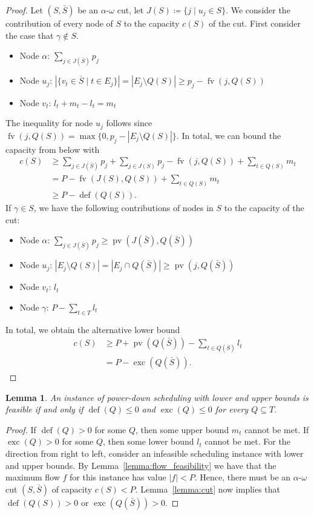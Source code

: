 \documentclass[a4paper]{article}
\DeclareMathOperator{\fv}{fv}
\DeclareMathOperator{\pv}{pv}
\DeclareMathOperator{\opdef}{def}
\DeclareMathOperator{\exc}{exc}
\newtheorem{lemma}[theorem]{Lemma}
\begin{document}
\begin{proof}
  Let $(S, \bar S)$ be an $\alpha$-$\omega$ cut, let $J(S) \coloneqq \{j \mid u_j \in S\}$.
  We consider the contribution of every node of $S$ to the capacity $c(S)$ of the cut.
  First consider the case that $\gamma \notin S$.
  \begin{itemize}
    \item Node $\alpha$: $\sum_{j \in J(\bar S)} p_j$
    \item Node $u_j$: $|\{v_t \in \bar S \mid t \in E_j\}| = | E_j \setminus Q(S) | \geq p_j - \fv(j, Q(S))$
    \item Node $v_t$: $l_t + m_t - l_t = m_t$
  \end{itemize}
  The inequality for node $u_j$ follows since $\fv(j, Q(S)) = \max \{0, p_j - |E_j \setminus Q(S)| \}$.
  In total, we can bound the capacity from below with
  \begin{align}
    c(S) &\geq \sum_{j \in J(\bar S)} p_j + \sum_{j \in J(S)} p_j - \fv(j, Q(S)) + \sum_{t \in Q(S)} m_t
    \\ &= P - \fv(J(S), Q(S)) + \sum_{t \in Q(S)} m_t
    \\ &\geq P - \opdef(Q(S))\text{.}
  \end{align}
  If $\gamma \in S$, we have the following contributions of nodes in $S$ to the capacity of the cut:
  \begin{itemize}
    \item Node $\alpha$: $\sum_{j \in J(\bar S)} p_j \geq \pv(J(\bar S), Q(\bar S))$
    \item Node $u_j$: $| E_j \setminus Q(S) |
      = | E_j \cap Q(\bar S)| \geq \pv(j, Q(\bar S))$
    \item Node $v_t$: $l_t$
    \item Node $\gamma$: $P - \sum_{t \in T} l_t$
  \end{itemize}
  In total, we obtain the alternative lower bound
  \begin{align}
    c(S) &\geq P + \pv(Q(\bar S))
    - \sum_{t \in Q(\bar S)} l_t
    \\ &= P - \exc(Q(\bar S)) \text{.}
  \end{align}

\end{proof}

\begin{lemma}\label{lemma:feasibility}
  An instance of power-down scheduling with lower and upper bounds is feasible if and only if $\opdef(Q) \leq 0$ and $\exc(Q) \leq 0$ for every $Q \subseteq T$.
\end{lemma}
\begin{proof}
  If $\opdef(Q) > 0$ for some $Q$, then some upper bound $m_t$ cannot be met.
  If $\exc(Q) > 0$ for some $Q$, then some lower bound $l_t$ cannot be met.
  For the direction from right to left, consider an infeasible scheduling instance with lower and upper bounds.
  By Lemma~\ref{lemma:flow_feasibility} we have that the maximum flow $f$ for this instance has value $|f| < P$.
  Hence, there must be an $\alpha$-$\omega$ cut $(S, \bar S)$ of capacity $c(S) < P$.
  Lemma~\ref{lemma:cut} now implies that $\opdef(Q(S)) > 0$ or $\exc(Q(\bar S)) > 0$.
\end{proof}
\end{document}
